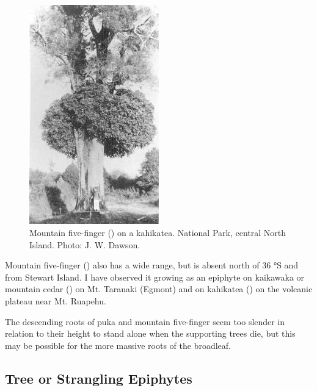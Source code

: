 \begin{figure}
	\includegraphics[width=0.5\textwidth]{graphics/figure49fivefinger.jpg}
	\centering
	\caption[Mountain five-finger on a kahikatea]{Mountain five-finger () on a kahikatea.
National Park, central North Island.
	Photo: J. W. Dawson.}%
	\label{fig:49fivefinger}
\end{figure}

Mountain five-finger () also has a wide range, but is absent north of 36 °S and from Stewart Island.
I have observed it growing as an epiphyte on kaikawaka or mountain cedar () on Mt.
Taranaki (Egmont) and on kahikatea () on the volcanic plateau near Mt.
Ruapehu.

The descending roots of puka and mountain five-finger seem too slender in relation to their height to stand alone when the supporting trees die, but this may be possible for the more massive roots of the broadleaf.

\subsection{Tree or Strangling Epiphytes}

